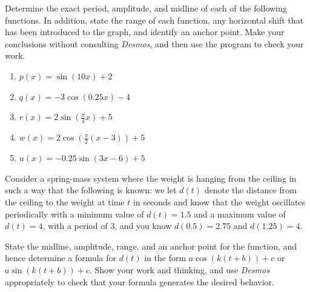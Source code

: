 \documentclass{ximera}
\begin{document}
\begin{exploration}
Determine the exact period, amplitude, and midline of each of the following functions.  In addition,  state the range of each function, any horizontal shift that has been introduced to the graph, and identify an anchor point.  Make your conclusions without consulting \emph{Desmos}, and then use the program to check your work.%

\begin{enumerate}[label=\alph*.]
\item
\(p(x) = \sin(10x) + 2\)%
\item
\(q(x) = -3\cos(0.25x) - 4\)%
\item
\(r(x) = 2\sin\left( \frac{\pi}{4} x\right) + 5\)%
\item
\(w(x) = 2\cos\left( \frac{\pi}{2} (x-3) \right) + 5\)%
\item
\(u(x) = -0.25\sin\left(3x-6\right) + 5\)%
\end{enumerate}

\end{exploration}
\begin{exploration}
Consider a spring-mass system where the weight is hanging from the ceiling in such a way that the following is known: we let \(d(t)\) denote the distance from the ceiling to the weight at time \(t\) in seconds and know that the weight oscillates periodically with a minimum value of \(d(t) = 1.5\) and a maximum value of \(d(t) = 4\), with a period of \(3\), and you know \(d(0.5) = 2.75\) and \(d\left(1.25\right) = 4\).%

State the midline, amplitude, range, and an anchor point for the function, and hence determine a formula for \(d(t)\) in the form \(a\cos(k(t+b))+c\) or \(a\sin(k(t+b))+c\). Show your work and thinking, and use \emph{Desmos} appropriately to check that your formula generates the desired behavior.%
\end{exploration}

%
%
%
\end{document}

